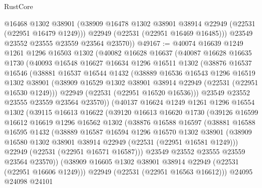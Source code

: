 \begin{lexlean}{RustCore}
\begin{coremodule}
          @16468
          @1302
          @38901
          (@38909 @16478 @1302 @38901 @38914 @22949 (@22531 (@22951 @16479 @1249)))
          @22949
          (@22531 (@22951 @16469 @16485)))
        @23549
        @23552
        @23555
        @23559
        @23564
        @23570))
@49167 := @40074
    @16639
    @1249
    @1261
    @1296
    @16503
    @1302
    (@40082
      @16628
      @16637
      (@40087
        @16628
        @16635
        @1730
        (@40093
          @16548
          @16627
          @16634
          @1296
          @16511
          @1302
          (@38876
            @16537
            @16546
            (@38881
              @16537
              @16544
              @1432
              (@38889
                @16536
                @16543
                @1296
                @16519
                @1302
                @38901
                (@38909 @16529 @1302 @38901 @38914 @22949 (@22531 (@22951 @16530 @1249)))
                @22949
                (@22531 (@22951 @16520 @16536)))
              @23549
              @23552
              @23555
              @23559
              @23564
              @23570))
          (@40137
            @16624
            @1249
            @1261
            @1296
            @16554
            @1302
            (@39115
              @16613
              @16622
              (@39120
                @16613
                @16620
                @1730
                (@39126
                  @16599
                  @16612
                  @16619
                  @1296
                  @16562
                  @1302
                  (@38876
                    @16588
                    @16597
                    (@38881
                      @16588
                      @16595
                      @1432
                      (@38889
                        @16587
                        @16594
                        @1296
                        @16570
                        @1302
                        @38901
                        (@38909 @16580 @1302 @38901 @38914 @22949 (@22531 (@22951 @16581 @1249)))
                        @22949
                        (@22531 (@22951 @16571 @16587)))
                      @23549
                      @23552
                      @23555
                      @23559
                      @23564
                      @23570))
                  (@38909 @16605 @1302 @38901 @38914 @22949 (@22531 (@22951 @16606 @1249)))
                  @22949
                  (@22531 (@22951 @16563 @16612)))
                @24095
                @24098
                @24101

\end{coremodule}
\end{lexlean}
